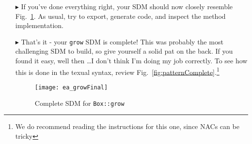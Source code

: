 \begin{itemize}
\vspace{0.5cm}

\item[$\blacktriangleright$] If you've done everything right, your SDM should now closely resemble Fig.~\ref{fig:growComplete}. As usual, try to export,
generate code, and inspect the method implementation.

\vspace{0.5cm}

\item[$\blacktriangleright$]  That's it - your \texttt{grow} SDM is complete! This was probably the most challenging SDM to build, so give yourself a solid 
pat on the back. If you found it easy, well then \ldots I don't think I'm doing my job correctly. To see how this is done in the texual syntax, review
Fig.~\ref{fig:patternComplete}.\footnote{We do recommend reading the instructions for this one, since NACs can be tricky}

\vspace{0.5cm}

\begin{figure}[htbp]
\begin{center}
  \texttt{[image: ea\_growFinal]}
  \caption{Complete SDM for \texttt{Box::grow}}  
  \label{fig:growComplete}
\end{center}
\end{figure}
\FloatBarrier


\end{itemize}
